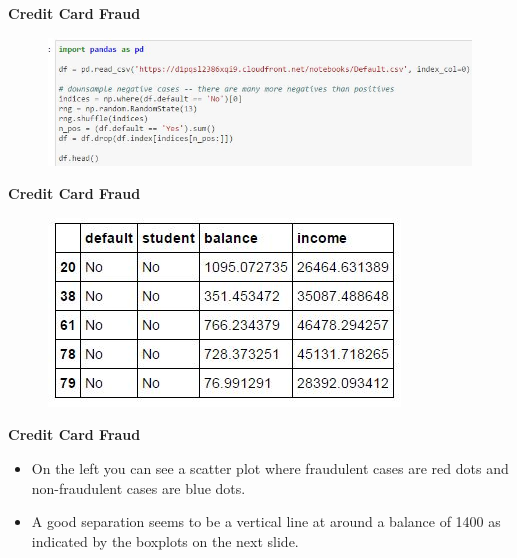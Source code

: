 \documentclass[MASTER.tex]{subfiles}
\begin{document}
\begin{frame}[fragile]
	\Large
\vspace{-1cm}
\textbf{Credit Card Fraud}
\begin{figure}
\centering
\includegraphics[width=1.2\linewidth]{sklcass/sklclass1}

\end{figure}

\end{frame}
\begin{frame}[fragile]
	\Large
\textbf{Credit Card Fraud}
\begin{figure}
\centering
\includegraphics[width=0.7\linewidth]{sklcass/sklclass2}

\end{figure}

\end{frame}

\begin{frame}[fragile]
	\Large
	\textbf{Credit Card Fraud}
	\begin{itemize}
\item 	On the left you can see a scatter plot where fraudulent cases are red dots and non-fraudulent cases are blue dots. 
\item A good separation seems to be a vertical line at around a balance of 1400 as indicated by the boxplots on the next slide.
	\end{itemize}
	

\end{frame}
\end{document}
